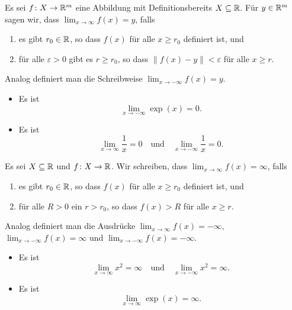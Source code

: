 \documentclass[a4paper,10pt]{article}
\begin{document}
\begin{defi}
 Es sei $f \colon X \to \mathbb{R}^m$ eine Abbildung mit Definitionsbereits $X \subseteq \mathbb{R}$. Für $y \in \mathbb{R}^m$ sagen wir, dass $\lim_{x \to \infty} f(x) = y$, falls
 \begin{enumerate}
  \item
   es gibt $r_0 \in \mathbb{R}$, so dass $f(x)$ für alle $x \geq r_0$ definiert ist, und
  \item
   für alle $\varepsilon > 0$ gibt es $r \geq r_0$, so dass $\|f(x) - y\| < \varepsilon$ für alle $x \geq r$.
 \end{enumerate}
 Analog definiert man die Schreibweise $\lim_{x \to -\infty} f(x) = y$.
\end{defi}


\begin{bsp}
 \begin{itemize}
  \item
   Es ist
   \[
    \lim_{x \to -\infty} \exp(x) = 0.
   \]
  \item
   Es ist
   \[
    \lim_{x \to \infty} \frac{1}{x} = 0
    \quad
    \text{und}
    \quad
    \lim_{x \to -\infty} \frac{1}{x} = 0.
   \]
 \end{itemize}
\end{bsp}


\begin{defi}
 Es sei $X \subseteq \mathbb{R}$ und $f \colon X \to \mathbb{R}$. Wir schreiben, dass $\lim_{x \to \infty} f(x) = \infty$, falls
 \begin{enumerate}
  \item
   es gibt $r_0 \in \mathbb{R}$, so dass $f(x)$ für alle $x \geq r_0$ definiert ist, und
  \item
   für alle $R > 0$ ein $r > r_0$, so dass $f(x) > R$ für alle $x \geq r$.
 \end{enumerate}
 Analog definiert man die Ausdrücke $\lim_{x \to \infty} f(x) = -\infty$, $\lim_{x \to -\infty} f(x) = \infty$ und $\lim_{x \to -\infty} f(x) = -\infty$. 
\end{defi}


\begin{bsp}
 \begin{itemize}
  \item
   Es ist
   \[
    \lim_{x \to \infty} x^2 = \infty
    \quad
    \text{und}
    \quad
    \lim_{x \to -\infty} x^2 = \infty.
   \]
  \item
   Es ist
   \[
    \lim_{x \to \infty} \exp(x) = \infty.
   \]
 \end{itemize}
\end{bsp}
\end{document}
